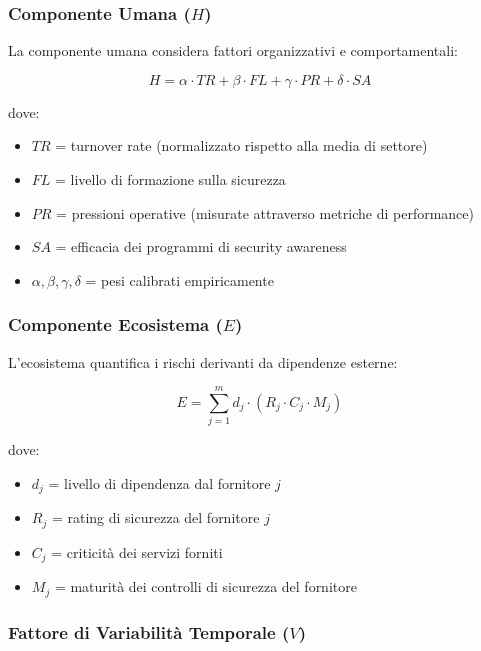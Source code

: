 \subsubsection{Componente Umana ($H$)}

La componente umana considera fattori organizzativi e comportamentali:

\begin{equation}
H = \alpha \cdot TR + \beta \cdot FL + \gamma \cdot PR + \delta \cdot SA
\end{equation}

dove:
\begin{itemize}
\item $TR$ = turnover rate (normalizzato rispetto alla media di settore)
\item $FL$ = livello di formazione sulla sicurezza
\item $PR$ = pressioni operative (misurate attraverso metriche di performance)
\item $SA$ = efficacia dei programmi di security awareness
\item $\alpha, \beta, \gamma, \delta$ = pesi calibrati empiricamente
\end{itemize}

\subsubsection{Componente Ecosistema ($E$)}

L'ecosistema quantifica i rischi derivanti da dipendenze esterne:

\begin{equation}
E = \sum_{j=1}^{m} d_j \cdot (R_j \cdot C_j \cdot M_j)
\end{equation}

dove:
\begin{itemize}
\item $d_j$ = livello di dipendenza dal fornitore $j$
\item $R_j$ = rating di sicurezza del fornitore $j$
\item $C_j$ = criticità dei servizi forniti
\item $M_j$ = maturità dei controlli di sicurezza del fornitore
\end{itemize}

\subsubsection{Fattore di Variabilità Temporale ($V$)}

